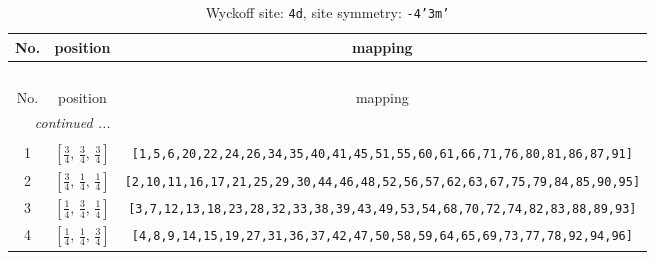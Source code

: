 \documentclass[fleqn,8pt]{jsarticle}
\begin{document}
\renewcommand{\arraystretch}{1.2}
\begin{longtable}{ccc}
\caption{Wyckoff site: {\tt 4d}, site symmetry: {\tt -4'3m'}}
 \\
 \hline \hline
No. & position & mapping \\ \hline \endfirsthead

\multicolumn{2}{l}{\tablename\ \thetable{}} \\
 \hline \hline
No. & position & mapping \\ \hline \endhead

 \hline \hline
\multicolumn{2}{r}{\footnotesize\it continued ...} \\ \endfoot

 \hline \hline
\multicolumn{2}{r}{} \\ \endlastfoot

1 & $\left[ \frac{3}{4},\, \frac{3}{4},\, \frac{3}{4} \right]$ & {\tt [1,5,6,20,22,24,26,34,35,40,41,45,51,55,60,61,66,71,76,80,81,86,87,91]} \\ \hline
2 & $\left[ \frac{3}{4},\, \frac{1}{4},\, \frac{1}{4} \right]$ & {\tt [2,10,11,16,17,21,25,29,30,44,46,48,52,56,57,62,63,67,75,79,84,85,90,95]} \\ \hline
3 & $\left[ \frac{1}{4},\, \frac{3}{4},\, \frac{1}{4} \right]$ & {\tt [3,7,12,13,18,23,28,32,33,38,39,43,49,53,54,68,70,72,74,82,83,88,89,93]} \\ \hline
4 & $\left[ \frac{1}{4},\, \frac{1}{4},\, \frac{3}{4} \right]$ & {\tt [4,8,9,14,15,19,27,31,36,37,42,47,50,58,59,64,65,69,73,77,78,92,94,96]} \\
\end{longtable}
\renewcommand{\arraystretch}{1.2}
\end{document}
